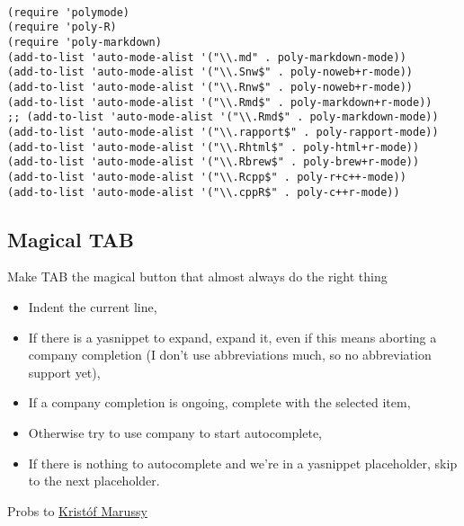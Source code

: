 \documentclass[11pt]{article}
\begin{document}
\begin{verbatim}

(require 'polymode)
(require 'poly-R)
(require 'poly-markdown)
(add-to-list 'auto-mode-alist '("\\.md" . poly-markdown-mode))
(add-to-list 'auto-mode-alist '("\\.Snw$" . poly-noweb+r-mode))
(add-to-list 'auto-mode-alist '("\\.Rnw$" . poly-noweb+r-mode))
(add-to-list 'auto-mode-alist '("\\.Rmd$" . poly-markdown+r-mode))
;; (add-to-list 'auto-mode-alist '("\\.Rmd$" . poly-markdown-mode))
(add-to-list 'auto-mode-alist '("\\.rapport$" . poly-rapport-mode))
(add-to-list 'auto-mode-alist '("\\.Rhtml$" . poly-html+r-mode))
(add-to-list 'auto-mode-alist '("\\.Rbrew$" . poly-brew+r-mode))
(add-to-list 'auto-mode-alist '("\\.Rcpp$" . poly-r+c++-mode))
(add-to-list 'auto-mode-alist '("\\.cppR$" . poly-c++r-mode))

\end{verbatim}

\subsection{Magical TAB}
\label{sec:org39877f3}
Make TAB the magical button that almost always do the right thing
\begin{itemize}
\item Indent the current line,
\item If there is a yasnippet to expand, expand it, even if this means aborting a company completion (I don't use abbreviations much, so no abbreviation support yet),
\item If a company completion is ongoing, complete with the selected item,
\item Otherwise try to use company to start autocomplete,
\item If there is nothing to autocomplete and we're in a yasnippet placeholder, skip to the next placeholder.
\end{itemize}
Probs to \href{https://emacs.stackexchange.com/a/7925/15689}{Kristóf Marussy}
\end{document}
